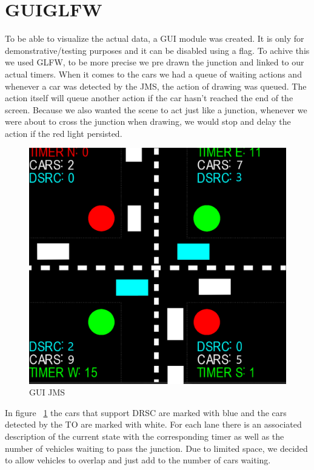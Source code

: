 \documentclass[17pt]{report}
\begin{document}
\section{GUIGLFW}
\indent \indent
To be able to visualize the actual data, a GUI module was created. 
It is only for demonstrative/testing purposes and it can be disabled 
using a flag. To achive this we used GLFW, to be more precise we 
pre drawn the junction and linked to our actual timers. When it comes
to the cars we had a queue of waiting actions and whenever a car
was detected by the JMS, the action of drawing was queued. The action
itself will queue another action if the car hasn't reached the end 
of the screen. Because we also wanted the scene to act just like a 
junction, whenever we were about to cross the junction when drawing, 
we would stop and delay the action if the red light persisted.

\begin{figure}[h!]
    \includegraphics[width=\textwidth]{running/GUI_JMS.png}
    \caption{GUI JMS}
    \label{fig:GUI JMS}
\end{figure}

\indent
In figure ~\ref{fig:GUI JMS} the cars that support DRSC are marked with 
blue and the cars detected by the TO are marked with white. For each
lane there is an associated description of the current state with the  
corresponding timer as well as the number of vehicles waiting to 
pass the junction. Due to limited space, we decided to allow 
vehicles to overlap and just add to the number of cars waiting.
\end{document}
